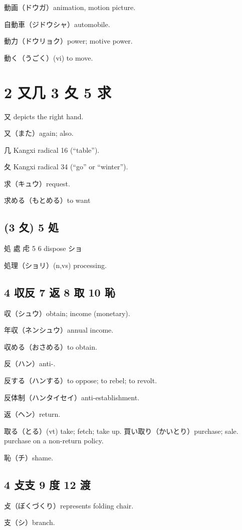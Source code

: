 動画（ドウガ）animation, motion picture.

自動車（ジドウシャ）automobile.

動力（ドウリョク）power; motive power.

動く（うごく）(vi) to move.

\section{2 又几 3 夂 5 求}

又 depicts the right hand.

又（また）again; also.

几 Kangxi radical 16 (``table'').

夂 Kangxi radical 34 (``go'' or ``winter'').

求（キュウ）request.

求める（もとめる）to want

\subsection{(3 夂) 5 処}

処 處 虍 5 6  dispose ショ

処理（ショリ）(n,vs) processing.

\subsection{4 収反 7 返 8 取 10 恥}

収（シュウ）obtain; income (monetary).

年収（ネンシュウ）annual income.

収める（おさめる）to obtain.

反（ハン）anti-.

反する（ハンする）to oppose; to rebel; to revolt.

反体制（ハンタイセイ）anti-establishment.

返（ヘン）return.

取る（とる）(vt) take; fetch; take up.
買い取り（かいとり）purchase; sale. purchase on a non-return policy.

恥（チ）shame.

\subsection{4 攴支 9 度 12 渡}

攴（ぼくづくり）represents folding chair.

支（シ）branch.

